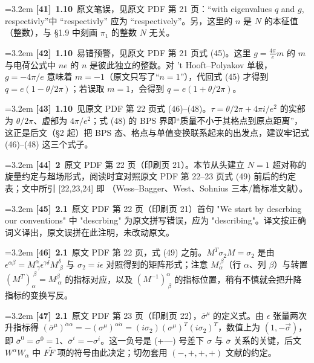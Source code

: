 \par
\par\medskip\noindent\hangindent=3.2em \textbf{[41]}~\textbf{1.10}~原文笔误，见原文 PDF 第 21 页：“with eigenvalues $q$ and $g$, respectivly”中 “respectivly” 应为 “respectively”。另，这里的 $n$ 是 $N$ 的本征值（整数），与 §1.9 中刻画 $\pi_1$ 的整数 $N$ 无关。
\par
\par\medskip\noindent\hangindent=3.2em \textbf{[42]}~\textbf{1.10}~易错预警，见原文 PDF 第 21 页式 (45)。这里 $g=\frac{4\pi}{e}m$ 的 $m$ 与电荷公式中 $ne$ 的 $n$ 是彼此独立的整数。对 't Hooft–Polyakov 单极，$g=-4\pi/e$ 意味着 $m=-1$（原文只写了“$n=1$”），代回式 (45) 才得到 $q=e(1-\theta/2\pi)$；若误取 $m=1$，会得到 $q=e(1+\theta/2\pi)$。
\par
\par\medskip\noindent\hangindent=3.2em \textbf{[43]}~\textbf{1.10}~见原文 PDF 第 22 页式 (46)–(48)。$\tau=\theta/2\pi+4\pi i/e^2$ 的实部为 $\theta/2\pi$、虚部为 $4\pi/e^2$；式 (48) 的 BPS 界即“质量不小于其格点到原点距离”，这正是后文（§2 起）把 BPS 态、格点与单值变换联系起来的出发点，建议牢记式 (46)–(48) 这三个式子。
\par
\par\medskip\noindent\hangindent=3.2em \textbf{[44]}~\textbf{2}~原文 PDF 第 22 页（印刷页 21）。本节从头建立 $N=1$ 超对称的旋量约定与超场形式，阅读时宜对照原文 PDF 第 22--23 页式 (49) 前后的约定表；文中所引 [22,23,24] 即 \cite{WB,West,Sohnius}（Wess--Bagger、West、Sohnius 三本/篇标准文献）。
\par
\par\medskip\noindent\hangindent=3.2em \textbf{[45]}~\textbf{2.1}~原文 PDF 第 22 页（印刷页 21）首句 "We start by descrbing our conventions" 中 "descrbing" 为原文拼写错误，应为 "describing"。译文按正确词义译出，原文误拼在此注明，未改动原文。
\par
\par\medskip\noindent\hangindent=3.2em \textbf{[46]}~\textbf{2.1}~原文 PDF 第 22 页，式 (49) 之前。$M^T\sigma_2M=\sigma_2$ 是由 $\epsilon^{\alpha\beta}=M^\alpha_{~\gamma}\epsilon^{\gamma\delta}M^\delta_{~\beta}$ 与 $\sigma_2=i\epsilon$ 对照得到的矩阵形式；注意 $M_\alpha^{~\beta}$（行 $\alpha$、列 $\beta$）与转置 $(M^T)_\alpha^{~\beta}=M^\beta_{~\alpha}$ 的指标对应，以及 $(M^{-1})^\alpha_{~\beta}$ 的指标位置，稍有不慎就会把升降指标的变换写反。
\par
\par\medskip\noindent\hangindent=3.2em \textbf{[47]}~\textbf{2.1}~原文 PDF 第 23 页（印刷页 22），$\bar\sigma^\mu$ 的定义式。由 $\epsilon$ 张量两次升指标得 $(\bar\sigma^\mu)^{\dot\alpha\alpha}=-(\sigma^\mu)^{\alpha\dot\alpha}=(i\sigma_2)(\sigma^\mu)^T(i\sigma_2)^T$，数值上为 $(1,-\vec\sigma)$，即 $\bar\sigma^0=\sigma^0=1$、$\bar\sigma^i=-\sigma^i$。这一负号是 (+---) 号差下 $\sigma$ 与 $\bar\sigma$ 关系的关键，后文 $W^\alpha W_\alpha$ 中 $F\widetilde F$ 项的符号由此决定；切勿套用 $(-,+,+,+)$ 文献的约定。
